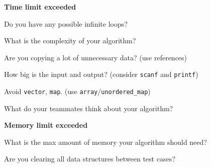 \documentclass[12pt, a4paper, twoside]{article}
\begin{document}
\noindent
\textbf{Time limit exceeded}

\noindent
Do you have any possible infinite loops?

\noindent
What is the complexity of your algorithm?

\noindent
Are you copying a lot of unnecessary data? (use references)

\noindent
How big is the input and output? (consider \texttt{scanf} and \texttt{printf})

\noindent
Avoid \texttt{vector}, \texttt{map}. (use \texttt{array}/\texttt{unordered\_map})

\noindent
What do your teammates think about your algorithm?

\noindent
\textbf{Memory limit exceeded}

\noindent
What is the max amount of memory your algorithm should need?

\noindent
Are you clearing all data structures between test cases?
\end{document}
